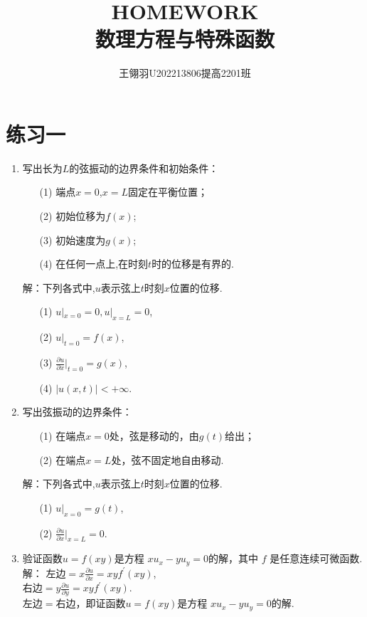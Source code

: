 \documentclass[11pt]{article}
\begin{document}
\title{\vspace{-2cm}HOMEWORK\\ 数理方程与特殊函数}
\author{王翎羽\quad U202213806\quad 提高2201班}
\maketitle

\section*{练习一}
\begin{enumerate}
    \item 写出长为$L$的弦振动的边界条件和初始条件：
    \begin{enumerate}
        \item[(1)] 端点$x=0$,$x=L$固定在平衡位置；
        \item[(2)] 初始位移为$f(x)$;
        \item[(3)] 初始速度为$g(x)$;
        \item[(4)] 在任何一点上,在时刻$t$时的位移是有界的.
    \end{enumerate}
    解：下列各式中,$u$表示弦上$t$时刻$x$位置的位移.
    \begin{enumerate}
        \item[(1)] $u|_{x=0}=0, u|_{x=L}=0$,
        \item[(2)] $u|_{t=0}=f(x)$,
        \item[(3)] $\frac{\partial u}{\partial x}|_{t=0}=g(x)$,
        \item[(4)] $|u(x,t)|<+\infty$.
    \end{enumerate}

    \item 写出弦振动的边界条件：
    \begin{enumerate}
        \item[(1)] 在端点$x=0$处，弦是移动的，由$g(t)$给出； 
        \item[(2)] 在端点$x=L$处，弦不固定地自由移动.
    \end{enumerate}
    解：下列各式中,$u$表示弦上$t$时刻$x$位置的位移.
    \begin{enumerate}
        \item[(1)] $u|_{x=0}=g(t)$,
        \item[(2)] $\frac{\partial u}{\partial x}|_{x=L}=0$.
    \end{enumerate}

    \item 验证函数$u=f(xy)$是方程 $xu_x-yu_y = 0 $的解，其中 $f$ 是任意连续可微函数.\\
    解： 左边$=x\frac{\partial u}{\partial x}=xyf^{'}(xy)$,\\右边$=y\frac{\partial u}{\partial y}=xyf^{'}(xy)$.\\
    左边$=$右边，即证函数$u=f(xy)$是方程 $xu_x-yu_y = 0 $的解.

\end{enumerate}
\setlength{\topmargin}{-18mm}
\end{document}
